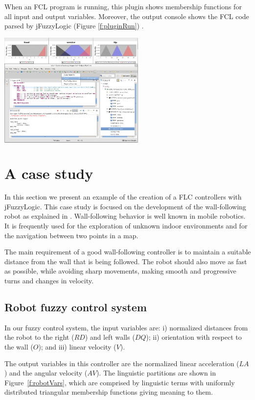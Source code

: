 \documentclass[11pt,twoside]{article}
\begin{document}
\begin{multicols}{2}
When an FCL program is running, this plugin shows membership functions for all input and output variables. Moreover, the output console shows the FCL code parsed by jFuzzyLogic (Figure \ref{f:pluginRun}) .

\vspace*{5pt}
\centerline{\includegraphics[width=2.84in]{./figs/plugin_run}}
\vspace*{5pt}
\label{f:pluginRun}


\section{A case study}
\label{sec:cas}


In this section we present an example of the creation of a FLC controllers with jFuzzyLogic. This case study is focused on the development of the wall-following robot as explained in \cite{Mucientes2010}. Wall-following behavior is well known in mobile robotics. It is frequently used for the exploration of unknown indoor environments and for the navigation between two points in a map. 

The main requirement of a good wall-following controller is to maintain a suitable distance from the wall that is being followed. The robot should also move as fast as possible, while avoiding sharp movements, making smooth and progressive turns and changes in velocity.


\subsection{Robot fuzzy control system \label{sec:casFuz}}

In our fuzzy control system, the input variables are: i) normalized distances from the robot to the right ($RD$) and left walls ($DQ$); ii) orientation with respect to the wall ($O$); and iii) linear velocity ($V$). 

The output variables in this controller are the normalized linear acceleration ($LA$) and the angular velocity ($AV$). The linguistic partitions are shown in Figure~\ref{f:robotVars}, which are comprised by linguistic terms with uniformly distributed triangular membership functions giving meaning to them.


\end{multicols}
\end{document}
